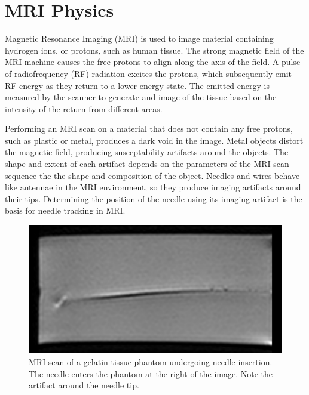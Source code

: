 \section{MRI Physics}

Magnetic Resonance Imaging (MRI) is used to image material containing hydrogen ions, or protons, such as human tissue. The strong magnetic field of the MRI machine causes the free protons to align along the axis of the field. A pulse of radiofrequency (RF) radiation excites the protons, which subsequently emit RF energy as they return to a lower-energy state. The emitted energy is measured by the scanner to generate and image of the tissue based on the intensity of the return from different areas.

Performing an MRI scan on a material that does not contain any free protons, such as plastic or metal, produces a dark void in the image\cite{lewin_needle_1996}. Metal objects distort the magnetic field, producing susceptability artifacts around the objects. The shape and extent of each artifact depends on the parameters of the MRI scan sequence the the shape and composition of the object. Needles and wires behave like antennae in the MRI environment, so they produce imaging artifacts around their tips. Determining the position of the needle using its imaging artifact is the basis for needle tracking in MRI\cite{song_biopsy_2012}.


\begin{figure}[h]
\includegraphics[width=1.0\textwidth]{Fig/chap1/mri_phantom.png}
\caption{MRI scan of a gelatin tissue phantom undergoing needle insertion. The needle enters the phantom at the right of the image. Note the artifact around the needle tip.}
\label{fig:mri_phantom}
\end{figure}


